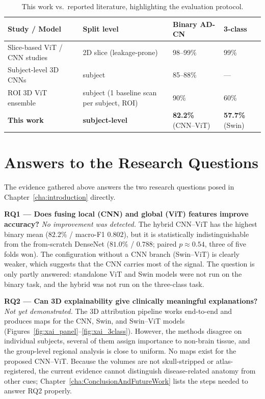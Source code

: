 \begin{table}[H]
\centering
\caption{This work vs.\ reported literature, highlighting the evaluation protocol.}
\label{tab:compare_lit}
\begin{tabular}{|p{5.2cm}|p{2.6cm}|p{2.6cm}|p{2.6cm}|}
\hline
\textbf{Study / Model} & \textbf{Split level} & \textbf{Binary AD-CN} & \textbf{3-class} \\
\hline
Slice-based ViT / CNN studies~\cite{alsaeed2022brain,mahim2024unlocking,alshayeji2024alzheimer,el2024novel} & 2D slice (leakage-prone) & 98--99\% & 99\% \\
Subject-level 3D CNNs~\cite{wen2020convolutional} & subject & 85--88\% & --- \\
ROI 3D ViT ensemble~\cite{saoud2024explainable} & subject (1 baseline scan per subject, ROI) & 90\% & 60\% \\
\textbf{This work} & \textbf{subject-level} & \textbf{82.2\%} (CNN--ViT) & \textbf{57.7\%} (Swin) \\
\hline
\end{tabular}
\end{table}

\section{Answers to the Research Questions}
The evidence gathered above answers the two research questions posed in Chapter~\ref{cha:introduction} directly.

\noindent\textbf{RQ1 --- Does fusing local (CNN) and global (ViT) features improve accuracy?} \emph{No improvement was detected.} The hybrid CNN--ViT has the highest binary mean ($82.2\%$ / macro-F1 $0.802$), but it is statistically indistinguishable from the from-scratch DenseNet ($81.0\%$ / $0.788$; paired $p\approx0.54$, three of five folds won). The configuration without a CNN branch (Swin--ViT) is clearly weaker, which suggests that the CNN carries most of the signal. The question is only partly answered: standalone ViT and Swin models were not run on the binary task, and the hybrid was not run on the three-class task.

\noindent\textbf{RQ2 --- Can 3D explainability give clinically meaningful explanations?} \emph{Not yet demonstrated.} The 3D attribution pipeline works end-to-end and produces maps for the CNN, Swin, and Swin--ViT models (Figures~\ref{fig:xai_panel}--\ref{fig:xai_3class}). However, the methods disagree on individual subjects, several of them assign importance to non-brain tissue, and the group-level regional analysis is close to uniform. No maps exist for the proposed CNN--ViT. Because the volumes are not skull-stripped or atlas-registered, the current evidence cannot distinguish disease-related anatomy from other cues; Chapter~\ref{cha:ConclusionAndFutureWork} lists the steps needed to answer RQ2 properly.


